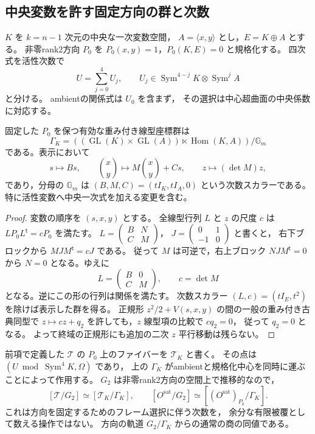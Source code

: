 \subsection{中央変数を許す固定方向の群と次数}
\label{subsec:binary-shadow-central-variables-quotient}

$K$ を $k=n-1$ 次元の中央な一次変数空間，
$A=\langle x,y\rangle$ とし，$E=K\oplus A$ とする。
非零rank2方向 $P_0$ を
$P_0(x,y)=1$，$P_0(K,E)=0$ と規格化する。
四次式を活性次数で
\[
 U=\sum_{j=0}^4 U_j,\qquad
 U_j\in\operatorname{Sym}^{4-j}K\otimes\operatorname{Sym}^{j}A
\]
と分ける。
ambientの関係式は $U_0$ を含まず，
その選択は中心超曲面の中央係数に対応する。

\begin{lemma}[固定方向の全座標群]
\label{lem:rank-two-full-coordinate-group}
固定した $P_0$ を保つ有効な重み付き線型座標群は
\[
 \Gamma_K=
 \left((\operatorname{GL}(K)\times\operatorname{GL}(A))
              \ltimes\operatorname{Hom}(K,A)\right)/\mathbb G_m
\]
である。表示において
\[
 s\longmapsto Bs,\qquad
 \binom{x}{y}\longmapsto M\binom{x}{y}+Cs,\qquad
 z\longmapsto(\det M)z,
\]
であり，分母の $\mathbb G_m$ は
$(B,M,C)=(tI_K,tI_A,0)$ という次数スカラーである。
特に活性変数へ中央一次式を加える変更を含む。
\end{lemma}
\begin{proof}
変数の順序を $(s,x,y)$ とする。
全線型行列 $L$ と $z$ の尺度 $c$ は
$LP_0L^{\mathsf t}=cP_0$ を満たす。
$L=\left(\begin{smallmatrix}B&N\\C&M\end{smallmatrix}\right)$，
$J=\left(\begin{smallmatrix}0&1\\-1&0\end{smallmatrix}\right)$ と書くと，
右下ブロックから $MJM^{\mathsf t}=cJ$ である。
従って $M$ は可逆で，右上ブロック
$NJM^{\mathsf t}=0$ から $N=0$ となる。ゆえに
\[
             L=\begin{pmatrix}B&0\\C&M\end{pmatrix},
             \qquad c=\det M
\]
となる。逆にこの形の行列は関係を満たす。
次数スカラー $(L,c)=(tI_E,t^2)$ を除けば表示した群を得る。
正規形 $z^2/2+V(s,x,y)$ の間の一般の重み付き古典同型で
$z\mapsto cz+q_2$ を許しても，$z$ 線型項の比較で $cq_2=0$，
従って $q_2=0$ となる。
よって終域の正規形にも追加の二次 $z$ 平行移動は残らない。
\end{proof}


前項で定義した $\mathcal T$ の $P_0$ 上のファイバーを $\mathcal T_K$ と書く。
その点は $(U\bmod\operatorname{Sym}^4K,\Omega)$ であり，
上の $\Gamma_K$ がambientと規格化中心を同時に運ぶことによって作用する。
$G_2$ は非零rank2方向の空間上で推移的なので，
\[
 [\mathcal T/G_2]\simeq[\mathcal T_K/\Gamma_K],\qquad
 [O^{\mathrm{sat}}/G_2]\simeq[(O^{\mathrm{sat}})_{P_0}/\Gamma_K].
\]
これは方向を固定するためのフレーム選択に伴う次数を，
余分な有限被覆として数える操作ではない。
方向の軌道 $G_2/\Gamma_K$ からの通常の商の同値である。

